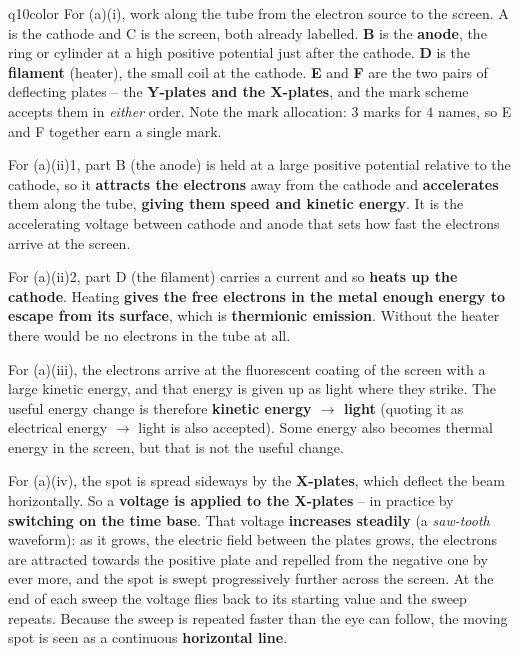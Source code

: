 \documentclass[11pt,a4paper]{article}
\begin{document}
\begin{ansbox}{q10color}
For (a)(i), work along the tube from the electron source to the screen. A is the cathode and C is the screen, both already labelled. \textbf{B} is the \textbf{anode}, the ring or cylinder at a high positive potential just after the cathode. \textbf{D} is the \textbf{filament} (heater), the small coil at the cathode. \textbf{E} and \textbf{F} are the two pairs of deflecting plates -- the \textbf{Y-plates and the X-plates}, and the mark scheme accepts them in \emph{either} order. Note the mark allocation: $3$ marks for $4$ names, so E and F together earn a single mark.

For (a)(ii)1, part B (the anode) is held at a large positive potential relative to the cathode, so it \textbf{attracts the electrons} away from the cathode and \textbf{accelerates} them along the tube, \textbf{giving them speed and kinetic energy}. It is the accelerating voltage between cathode and anode that sets how fast the electrons arrive at the screen.

For (a)(ii)2, part D (the filament) carries a current and so \textbf{heats up the cathode}. Heating \textbf{gives the free electrons in the metal enough energy to escape from its surface}, which is \textbf{thermionic emission}. Without the heater there would be no electrons in the tube at all.

For (a)(iii), the electrons arrive at the fluorescent coating of the screen with a large kinetic energy, and that energy is given up as light where they strike. The useful energy change is therefore \textbf{kinetic energy $\rightarrow$ light} (quoting it as electrical energy $\rightarrow$ light is also accepted). Some energy also becomes thermal energy in the screen, but that is not the useful change.

For (a)(iv), the spot is spread sideways by the \textbf{X-plates}, which deflect the beam horizontally. So a \textbf{voltage is applied to the X-plates} -- in practice by \textbf{switching on the time base}. That voltage \textbf{increases steadily} (a \emph{saw-tooth} waveform): as it grows, the electric field between the plates grows, the electrons are attracted towards the positive plate and repelled from the negative one by ever more, and the spot is swept progressively further across the screen. At the end of each sweep the voltage flies back to its starting value and the sweep repeats. Because the sweep is repeated faster than the eye can follow, the moving spot is seen as a continuous \textbf{horizontal line}.


\end{ansbox}
\end{document}
